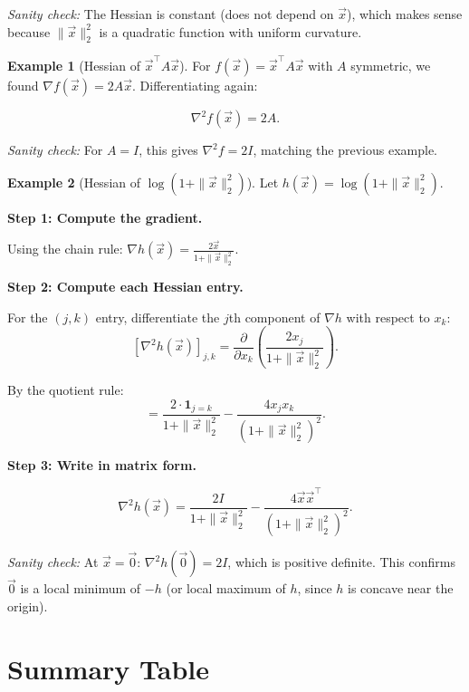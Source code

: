 \documentclass[10pt, twocolumn]{article}
\theoremstyle{definition}
\newtheorem{example}{Example}
\theoremstyle{plain}
\begin{document}
\textit{Sanity check:} The Hessian is constant (does not depend on $\vec{x}$), which makes sense because $\|\vec{x}\|_2^2$ is a quadratic function with uniform curvature. \checkmark

\begin{example}[Hessian of $\vec{x}^\top A \vec{x}$]
For $f(\vec{x}) = \vec{x}^\top A \vec{x}$ with $A$ symmetric, we found $\nabla f(\vec{x}) = 2A\vec{x}$. Differentiating again:
\begin{result}
\[
    \nabla^2 f(\vec{x}) = 2A.
\]
\end{result}
\end{example}

\textit{Sanity check:} For $A = I$, this gives $\nabla^2 f = 2I$, matching the previous example. \checkmark

\begin{example}[Hessian of $\log(1 + \|\vec{x}\|_2^2)$]
Let $h(\vec{x}) = \log(1 + \|\vec{x}\|_2^2)$.

\textbf{Step 1: Compute the gradient.}

Using the chain rule: $\nabla h(\vec{x}) = \frac{2\vec{x}}{1 + \|\vec{x}\|_2^2}$.

\textbf{Step 2: Compute each Hessian entry.}

For the $(j, k)$ entry, differentiate the $j$th component of $\nabla h$ with respect to $x_k$:
\[
    [\nabla^2 h(\vec{x})]_{j,k} = \frac{\partial}{\partial x_k}\!\left(\frac{2x_j}{1 + \|\vec{x}\|_2^2}\right).
\]

By the quotient rule:
\[
    = \frac{2 \cdot \mathbf{1}_{j=k}}{1 + \|\vec{x}\|_2^2} - \frac{4 x_j x_k}{(1 + \|\vec{x}\|_2^2)^2}.
\]

\textbf{Step 3: Write in matrix form.}
\begin{result}
\[
    \nabla^2 h(\vec{x}) = \frac{2I}{1 + \|\vec{x}\|_2^2} - \frac{4\vec{x}\vec{x}^\top}{(1 + \|\vec{x}\|_2^2)^2}.
\]
\end{result}
\end{example}

\textit{Sanity check:} At $\vec{x} = \vec{0}$: $\nabla^2 h(\vec{0}) = 2I$, which is positive definite. This confirms $\vec{0}$ is a local minimum of $-h$ (or local maximum of $h$, since $h$ is concave near the origin). \checkmark

\section{Summary Table}
\end{document}
